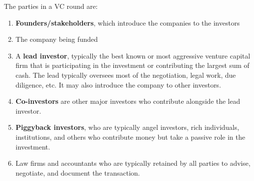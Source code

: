 \documentclass{article}
\begin{document}
    \begin{definition}
      The parties in a VC round are: 
      \begin{enumerate}
        \item \textbf{Founders/stakeholders}, which introduce the companies to the investors
        \item The company being funded
        \item A \textbf{lead investor}, typically the best known or most aggressive venture capital firm that is participating in the investment or contributing the largest sum of cash. The lead typically oversees most of the negotiation, legal work, due diligence, etc. It may also introduce the company to other investors. 
        \item \textbf{Co-investors} are other major investors who contribute alongside the lead investor. 
        \item \textbf{Piggyback investors}, who are typically angel investors, rich individuals, institutions, and others who contribute money but take a passive role in the investment. 
        \item Law firms and accountants who are typically retained by all parties to advise, negotiate, and document the transaction. 
      \end{enumerate}
    \end{definition}
\end{document}
